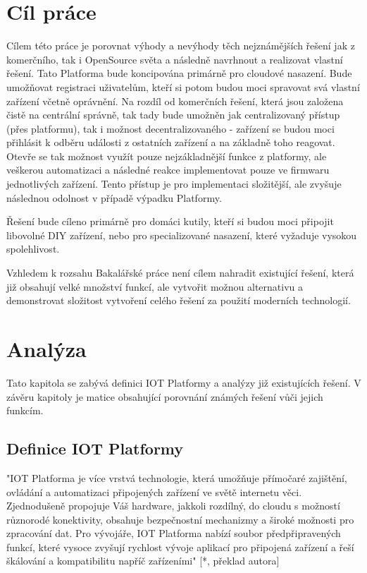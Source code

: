 \documentclass[thesis=B,czech]{FITthesis}[2019/12/23]
\begin{document}
\chapter{Cíl práce}
Cílem této práce je porovnat výhody a nevýhody těch nejznámějších řešení jak z komerčního, tak i OpenSource světa a následně navrhnout a realizovat vlastní řešení. Tato Platforma bude koncipována primárně pro cloudové nasazení. Bude umožňovat registraci uživatelům, kteří si potom budou moci spravovat svá vlastní zařízení včetně oprávnění. Na rozdíl od komerčních řešení, která jsou založena čistě na centrální správně, tak tady bude umožněn jak centralizovaný přístup (přes platformu), tak i možnost decentralizovaného - zařízení se budou moci přihlásit k odběru události z ostatních zařízení a na základně toho reagovat. Otevře se tak možnost využít pouze nejzákladnější funkce z platformy, ale veškerou automatizaci a následné reakce implementovat pouze ve firmwaru jednotlivých zařízení. Tento přístup je pro implementaci složitější, ale zvyšuje následnou odolnost v případě výpadku Platformy.

Řešení bude cíleno primárně pro domáci kutily, kteří si budou moci připojit libovolné DIY zařízení, nebo pro specializované nasazení, které vyžaduje vysokou spolehlivost.

Vzhledem k rozsahu Bakalářské práce není cílem nahradit existující řešení, která již obsahují velké množství funkcí, ale vytvořit možnou alternativu a demonstrovat složitost vytvoření celého řešení za použití moderních technologií.



\chapter{Analýza}
Tato kapitola se zabývá definici IOT Platformy a analýzy již existujících řešení. V závěru kapitoly je matice obsahující porovnání známých řešení vůči jejich funkcím.

\section{Definice IOT Platformy}
"IOT Platforma je více vrstvá technologie, která umožňuje přímočaré zajištění, ovládání a automatizaci připojených zařízení ve světě internetu věci. Zjednodušeně propojuje Váš hardware, jakkoli rozdílný, do cloudu s možností různorodé konektivity, obsahuje bezpečnostní mechanizmy a široké možnosti pro zpracování dat. Pro vývojáře, IOT Platforma nabízí soubor předpřipravených funkcí, které vysoce zvyšují rychlost vývoje aplikací pro připojená zařízení a řeší škálování a kompatibilitu napříč zařízeními" [*, překlad autora] %
\end{document}
